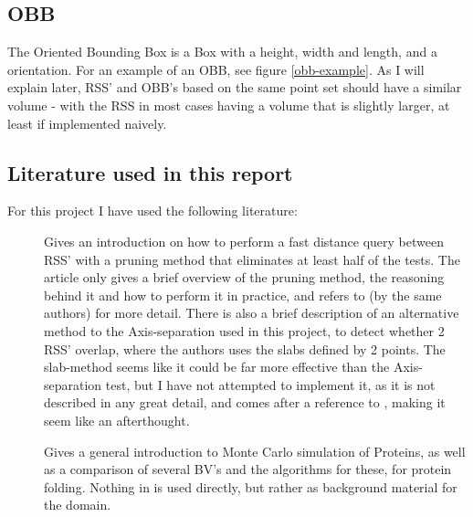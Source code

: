 \subsection{OBB}
The Oriented Bounding Box is a Box with a height, width and length, and a orientation. For an example of an OBB, see figure \ref{obb-example}. As I will explain later, RSS' and OBB's based on the same point set should have a similar volume - with the RSS in most cases having a volume that is slightly larger, at least if implemented naively.

\subsection{Literature used in this report}
\label{lit}
For this project I have used the following literature:
\begin{description}
\item[\cite{larsen00fast}] Gives an introduction on how to perform a fast distance query between RSS' with a pruning method that eliminates at least half of the tests. The article only gives a brief overview of the pruning method, the reasoning behind it and how to perform it in practice, and refers to \cite{Larsen99fastproximity} (by the same authors) for more detail. There is also a brief description of an alternative method to the Axis-separation used in this project, to detect whether 2 RSS' overlap, where the authors uses the slabs defined by 2 points. The slab-method seems like it could be far more effective than the Axis-separation test, but I have not attempted to implement it, as it is not described in any great detail, and comes after a reference to \cite{Larsen99fastproximity}, making it seem like an afterthought.   

\item[\cite{Lotan03algorithmand}] Gives a general introduction to Monte Carlo simulation of Proteins, as well as a comparison of several BV's and the algorithms for these, for protein folding. Nothing in \cite{Lotan03algorithmand} is used directly, but rather as background material for the domain.


\end{description}

